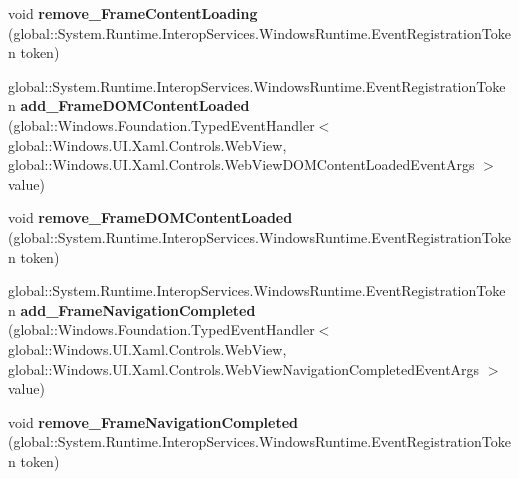 \begin{DoxyCompactItemize}
\item 
\mbox{\label{interface_windows_1_1_u_i_1_1_xaml_1_1_controls_1_1_i_web_view2_a5b4a40e6d22653be9ab3f75aed948798}} 
void {\bfseries remove\+\_\+\+Frame\+Content\+Loading} (global\+::\+System.\+Runtime.\+Interop\+Services.\+Windows\+Runtime.\+Event\+Registration\+Token token)
\item 
\mbox{\label{interface_windows_1_1_u_i_1_1_xaml_1_1_controls_1_1_i_web_view2_a7a047d6e440aef821db8493d115765ab}} 
global\+::\+System.\+Runtime.\+Interop\+Services.\+Windows\+Runtime.\+Event\+Registration\+Token {\bfseries add\+\_\+\+Frame\+D\+O\+M\+Content\+Loaded} (global\+::\+Windows.\+Foundation.\+Typed\+Event\+Handler$<$ global\+::\+Windows.\+U\+I.\+Xaml.\+Controls.\+Web\+View, global\+::\+Windows.\+U\+I.\+Xaml.\+Controls.\+Web\+View\+D\+O\+M\+Content\+Loaded\+Event\+Args $>$ value)
\item 
\mbox{\label{interface_windows_1_1_u_i_1_1_xaml_1_1_controls_1_1_i_web_view2_a9a0644d03c587152ca5463dd2d8dfff8}} 
void {\bfseries remove\+\_\+\+Frame\+D\+O\+M\+Content\+Loaded} (global\+::\+System.\+Runtime.\+Interop\+Services.\+Windows\+Runtime.\+Event\+Registration\+Token token)
\item 
\mbox{\label{interface_windows_1_1_u_i_1_1_xaml_1_1_controls_1_1_i_web_view2_a494bc914cf561ec9468446ccfa74f5e6}} 
global\+::\+System.\+Runtime.\+Interop\+Services.\+Windows\+Runtime.\+Event\+Registration\+Token {\bfseries add\+\_\+\+Frame\+Navigation\+Completed} (global\+::\+Windows.\+Foundation.\+Typed\+Event\+Handler$<$ global\+::\+Windows.\+U\+I.\+Xaml.\+Controls.\+Web\+View, global\+::\+Windows.\+U\+I.\+Xaml.\+Controls.\+Web\+View\+Navigation\+Completed\+Event\+Args $>$ value)
\item 
\mbox{\label{interface_windows_1_1_u_i_1_1_xaml_1_1_controls_1_1_i_web_view2_a63fd5a4351db39afa6abecf66d0cd735}} 
void {\bfseries remove\+\_\+\+Frame\+Navigation\+Completed} (global\+::\+System.\+Runtime.\+Interop\+Services.\+Windows\+Runtime.\+Event\+Registration\+Token token)

\end{DoxyCompactItemize}
